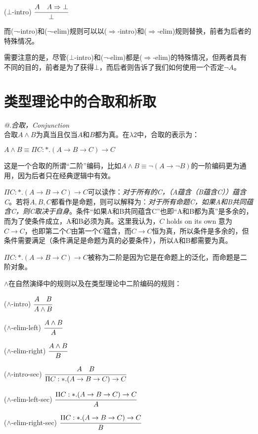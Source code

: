 \documentclass[UTF8]{article}
\makeatletter
\newcommand{\Rmnum}[1]{\expandafter\@slowromancap\romannumeral #1@}
\makeatother
\begin{document}
		($\bot$-intro) $\cfrac{A\ \ \ A\Rightarrow\bot}{\bot}$
		
		而($\neg$-intro)和($\neg$-elim)规则可以以($\Rightarrow$-intro)和($\Rightarrow$-elim)规则替换，前者为后者的特殊情况。
		
		需要注意的是，尽管($\bot$-intro)和($\neg$-elim)都是($\Rightarrow$-elim)的特殊情况，但两者具有不同的目的，前者是为了获得$\bot$，而后者则告诉了我们如何使用一个否定$\neg A$。
		
	\section{类型理论中的合取和析取}
	\noindent
	\textit{\Rmnum{1}.合取，Conjunction}\\
	合取$A\land B$为真当且仅当$A$和$B$都为真。在$\lambda{2}$中，合取的表示为：
	
		$A\land B\equiv\Pi C:*.(A\rightarrow B\rightarrow C)\rightarrow C$
		
		这是一个合取的所谓“二阶”编码，比如$A\land B\equiv\neg(A\rightarrow\neg B)$的一阶编码更为通用，因为后者只在经典逻辑中有效。
		
		$\Pi C:*.(A\rightarrow B\rightarrow C)\rightarrow C$可以读作：\textit{对于所有的C，（A蕴含（B蕴含C））蕴含C}。若将$A,B,C$都看作是命题，则可以解释为：\textit{对于所有命题C，如果A和B共同蕴含C，则C取决于自身}。条件“如果A和B共同蕴含C”也即“A和B都为真”是多余的，而为了使条件成立，A和B必须为真。这里我认为，$C$ holds on its own 意为 $C\rightarrow C$，也即第二个$C$由第一个$C$蕴含，而$C\rightarrow C$恒为真，所以条件是多余的，但条件需要满足（条件满足是命题为真的必要条件），所以A和B都需要为真。
		
		$\Pi C:*.(A\rightarrow B\rightarrow C)\rightarrow C$被称为二阶是因为它是在命题上的泛化，而命题是二阶对象。
		
		$\land$在自然演绎中的规则以及在类型理论中二阶编码的规则：
		
		($\land$-intro) $\cfrac{A\ \ \ B}{A\land B}$
		
		($\land$-elim-left) $\cfrac{A\land B}{A}$
		
		($\land$-elim-right) $\cfrac{A\land B}{B}$
		
		($\land$-intro-sec) $\cfrac{A\ \ \ B}{\Pi C:*.(A\rightarrow B\rightarrow C)\rightarrow C}$ 
		
		($\land$-elim-left-sec) $\cfrac{\Pi C:*.(A\rightarrow B\rightarrow C)\rightarrow C}{A}$
		
		($\land$-elim-right-sec) $\cfrac{\Pi C:*.(A\rightarrow B\rightarrow C)\rightarrow C}{B}$ 
\end{document}
